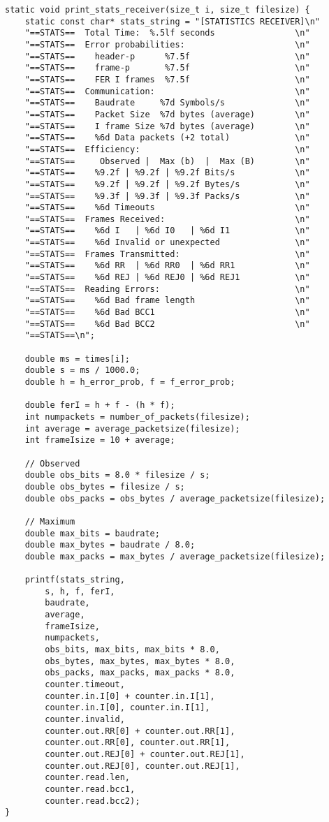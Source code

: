 \documentclass[subfiles]{main.tex}
\begin{document}
\begin{lstlisting}[style=rcom]
static void print_stats_receiver(size_t i, size_t filesize) {
	static const char* stats_string = "[STATISTICS RECEIVER]\n"
	"==STATS==  Total Time:  %.5lf seconds                \n"
	"==STATS==  Error probabilities:                      \n"
	"==STATS==    header-p      %7.5f                     \n"
	"==STATS==    frame-p       %7.5f                     \n"
	"==STATS==    FER I frames  %7.5f                     \n"
	"==STATS==  Communication:                            \n"
	"==STATS==    Baudrate     %7d Symbols/s              \n"
	"==STATS==    Packet Size  %7d bytes (average)        \n"
	"==STATS==    I frame Size %7d bytes (average)        \n"
	"==STATS==    %6d Data packets (+2 total)             \n"
	"==STATS==  Efficiency:                               \n"
	"==STATS==     Observed |  Max (b)  |  Max (B)        \n"
	"==STATS==    %9.2f | %9.2f | %9.2f Bits/s            \n"
	"==STATS==    %9.2f | %9.2f | %9.2f Bytes/s           \n"
	"==STATS==    %9.3f | %9.3f | %9.3f Packs/s           \n"
	"==STATS==    %6d Timeouts                            \n"
	"==STATS==  Frames Received:                          \n"
	"==STATS==    %6d I   | %6d I0   | %6d I1             \n"
	"==STATS==    %6d Invalid or unexpected               \n"
	"==STATS==  Frames Transmitted:                       \n"
	"==STATS==    %6d RR  | %6d RR0  | %6d RR1            \n"
	"==STATS==    %6d REJ | %6d REJ0 | %6d REJ1           \n"
	"==STATS==  Reading Errors:                           \n"
	"==STATS==    %6d Bad frame length                    \n"
	"==STATS==    %6d Bad BCC1                            \n"
	"==STATS==    %6d Bad BCC2                            \n"
	"==STATS==\n";
	
	double ms = times[i];
	double s = ms / 1000.0;
	double h = h_error_prob, f = f_error_prob;
	
	double ferI = h + f - (h * f);
	int numpackets = number_of_packets(filesize);
	int average = average_packetsize(filesize);
	int frameIsize = 10 + average;
	
	// Observed
	double obs_bits = 8.0 * filesize / s;
	double obs_bytes = filesize / s;
	double obs_packs = obs_bytes / average_packetsize(filesize);
	
	// Maximum
	double max_bits = baudrate;
	double max_bytes = baudrate / 8.0;
	double max_packs = max_bytes / average_packetsize(filesize);
	
	printf(stats_string,
		s, h, f, ferI,
		baudrate,
		average,
		frameIsize,
		numpackets,
		obs_bits, max_bits, max_bits * 8.0,
		obs_bytes, max_bytes, max_bytes * 8.0,
		obs_packs, max_packs, max_packs * 8.0,
		counter.timeout,
		counter.in.I[0] + counter.in.I[1],
		counter.in.I[0], counter.in.I[1],
		counter.invalid,
		counter.out.RR[0] + counter.out.RR[1],
		counter.out.RR[0], counter.out.RR[1],
		counter.out.REJ[0] + counter.out.REJ[1],
		counter.out.REJ[0], counter.out.REJ[1],
		counter.read.len,
		counter.read.bcc1,
		counter.read.bcc2);
}


\end{lstlisting}
\end{document}
